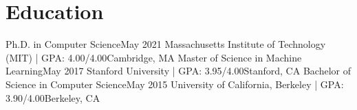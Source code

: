 \section{Education}
\resumeSubHeadingListStart
\vspace{-0.25cm}
    \resumeEducationEntry
      {Ph.D. in Computer Science}{May 2021}
      {Massachusetts Institute of Technology (MIT) | GPA: 4.00/4.00}{Cambridge, MA}
    \resumeEducationEntry
      {Master of Science in Machine Learning}{May 2017}
      {Stanford University | GPA: 3.95/4.00}{Stanford, CA}
    \resumeEducationEntry
      {Bachelor of Science in Computer Science}{May 2015}
      {University of California, Berkeley | GPA: 3.90/4.00}{Berkeley, CA}
\resumeSubHeadingListEnd
